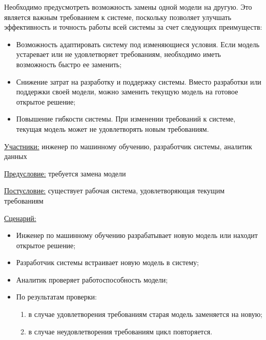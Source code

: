 Необходимо предусмотреть возможность замены одной модели на другую. Это является важным требованием к системе, поскольку позволяет улучшать эффективность и точность работы всей системы за счет следующих преимуществ:
\begin{itemize}
    \item Возможность адаптировать систему под изменяющиеся условия. Если модель устаревает или не удовлетворяет требованиям, необходимо иметь возможность быстро ее заменить;
    \item Снижение затрат на разработку и поддержку системы. Вместо разработки или поддержки своей модели, можно заменить текущую модель на готовое открытое решение;
    \item Повышение гибкости системы. При изменении требований к системе, текущая модель может не удовлетворять новым требованиям.
\end{itemize}

\underline{Участники:} инженер по машинному обучению, разработчик системы, аналитик данных

\underline{Предусловие:} требуется замена модели

\underline{Постусловие:} существует рабочая система, удовлетворяющая текущим требованиям

\underline{Сценарий:}

\begin{itemize}
    \item Инженер по машинному обучению разрабатывает новую модель или находит открытое решение;
    \item Разработчик системы встраивает новую модель в систему;
    \item Аналитик проверяет работоспособность модели;
    \item По результатам проверки:
        \begin{enumerate}
            \item в случае удовлетворения требованиям старая модель заменяется на новую;
            \item в случае неудовлетворения требованиям цикл повторяется.
        \end{enumerate}
\end{itemize}